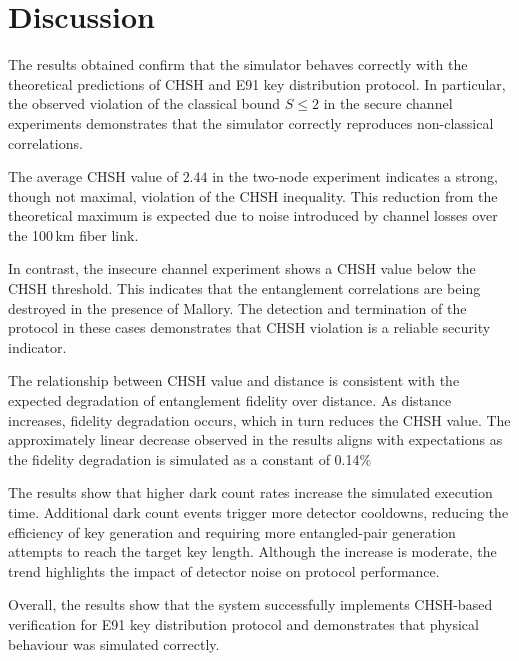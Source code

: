 \section{Discussion}\label{s:discussion}

The results obtained confirm that the simulator behaves correctly with the theoretical predictions of CHSH and E91 key distribution protocol. In particular, the observed violation of the classical bound \(S \leq 2\) in the secure channel experiments demonstrates that the simulator correctly reproduces non-classical correlations. 

The average CHSH value of \(2.44\) in the two-node experiment indicates a strong, though not maximal, violation of the CHSH inequality. This reduction from the theoretical maximum is expected due to noise introduced by channel losses over the 100\,km fiber link. 

In contrast, the insecure channel experiment shows a CHSH value below the CHSH threshold. This indicates that the entanglement correlations are being destroyed in the presence of Mallory. The detection and termination of the protocol in these cases demonstrates that CHSH violation is a reliable security indicator. 

The relationship between CHSH value and distance is consistent with the expected degradation of entanglement fidelity over distance. As distance increases, fidelity degradation occurs, which in turn reduces the CHSH value. The approximately linear decrease observed in the results aligns with expectations as the fidelity degradation is simulated as a constant of 0.14\%

The results show that higher dark count rates increase the simulated execution time. Additional dark count events trigger more detector cooldowns, reducing the efficiency of key generation and requiring more entangled-pair generation attempts to reach the target key length. Although the increase is moderate, the trend highlights the impact of detector noise on protocol performance.

Overall, the results show that the system successfully implements CHSH-based verification for E91 key distribution protocol and demonstrates that physical behaviour was simulated correctly.
